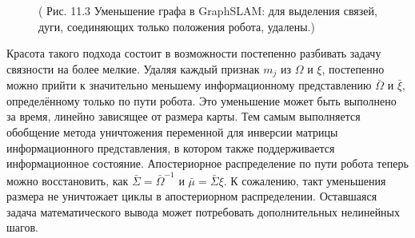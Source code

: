 \documentclass[10pt,a4paper]{article}
\begin{document}
\begin{figure}[H]
	\caption{ ( Рис. 11.3 Уменьшение графа в GraphSLAM:   для выделения связей, дуги, соединяющих только положения робота, удалены.)}
	\label{fig:113orig}
\end{figure}

Красота такого подхода состоит в возможности постепенно разбивать задачу связности на более мелкие. Удаляя каждый признак $m_j$ из $\varOmega$ и $\xi$, постепенно можно прийти к значительно меньшему информационному представлению $\bar{\varOmega}$ и $\bar{\xi}$, определённому только по пути робота. Это уменьшение может быть выполнено за время, линейно зависящее от размера карты. Тем самым выполняется обобщение метода уничтожения переменной для инверсии матрицы информационного представления, в котором также поддерживается информационное состояние. Апостериорное распределение по пути робота теперь можно восстановить, как $\bar{\varSigma}=\bar{\varOmega}^{-1}$ и $\bar{\mu}=\bar{\varSigma}\xi$.  К сожалению, такт уменьшения размера не уничтожает циклы в апостериорном распределении. Оставшаяся задача математического вывода может потребовать дополнительных нелинейных шагов.
\end{document}
